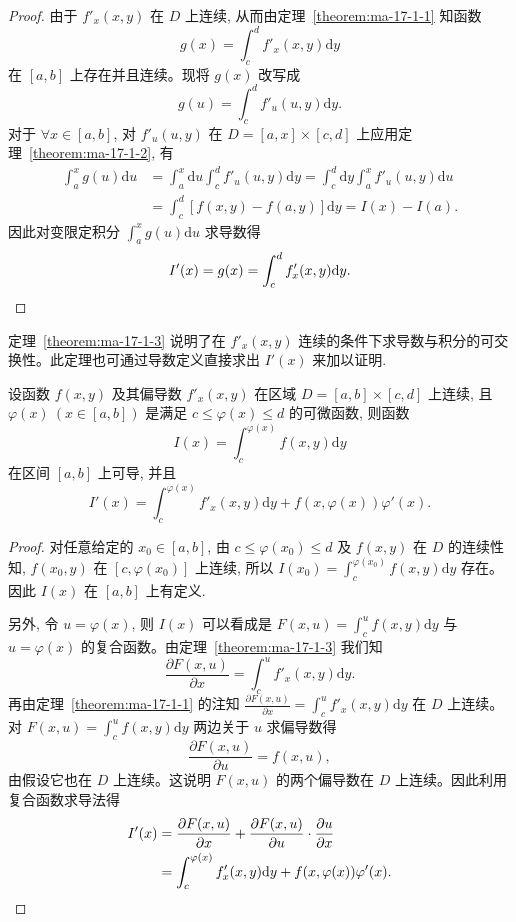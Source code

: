 \begin{proof}
由于 $f'_x(x,y)$ 在 $D$ 上连续, 从而由定理~\ref{theorem:ma-17-1-1} 知函数
\[
  g(x)=\int_c^d f'_x(x,y)\mathrm dy
\]
在 $[a,b]$ 上存在并且连续。现将 $g(x)$ 改写成
\[
  g(u)=\int_c^d f'_u(u,y)\mathrm dy.
\]
对于 $\forall x\in[a,b]$, 对 $f'_u(u,y)$ 在 $D=[a,x]\times[c,d]$ 上应用定理~\ref{theorem:ma-17-1-2}, 有
\[
\begin{aligned}
  \int_a^x g(u)\mathrm du
  &=\int_a^x \mathrm du\int_c^d f'_u(u,y)\mathrm dy
    =\int_c^d \mathrm dy\int_a^x f'_u(u,y)\mathrm du\\
  &=\int_c^d [f(x,y)-f(a,y)]\mathrm dy
    = I(x)-I(a).
\end{aligned}
\]
因此对变限定积分 $\int_a^x g(u)\mathrm du$ 求导数得
\[
  I'(x)=g(x)=\int_c^d f'_x(x,y)\mathrm dy.
\qedhere
\]
\end{proof}


定理~\ref{theorem:ma-17-1-3} 说明了在 $f'_x(x,y)$ 连续的条件下求导数与积分的可交换性。此定理也可通过导数定义直接求出 $I'(x)$ 来加以证明.

\begin{theorem}\label{theorem:ma-17-1-4}
设函数 $f(x,y)$ 及其偏导数 $f'_x(x,y)$ 在区域 $D=[a,b]\times[c,d]$ 上连续, 且 $\varphi(x)\ (x\in[a,b])$ 是满足 $c\leqslant \varphi(x)\leqslant d$ 的可微函数, 则函数
\[
  I(x)=\int_c^{\varphi(x)} f(x,y)\mathrm dy
\]
在区间 $[a,b]$ 上可导, 并且
\[
  I'(x)=\int_c^{\varphi(x)} f'_x(x,y)\mathrm dy
  + f(x,\varphi(x))\varphi'(x).
\]
\end{theorem}


\begin{proof}
对任意给定的 $x_0\in[a,b]$, 由 $c\leqslant\varphi(x_0)\leqslant d$ 及 $f(x,y)$ 在 $D$ 的连续性知, $f(x_0,y)$ 在 $[c,\varphi(x_0)]$ 上连续, 所以 $I(x_0)=\int_c^{\varphi(x_0)}f(x,y)\mathrm dy$ 存在。因此 $I(x)$ 在 $[a,b]$ 上有定义.

另外, 令 $u=\varphi(x)$, 则 $I(x)$ 可以看成是 $F(x,u)=\int_c^u f(x,y)\mathrm dy$ 与 $u=\varphi(x)$ 的复合函数。由定理~\ref{theorem:ma-17-1-3} 我们知
\[
  \frac{\partial F(x,u)}{\partial x}=\int_c^u f'_x(x,y)\mathrm dy.
\]
再由定理~\ref{theorem:ma-17-1-1} 的注知 $\frac{\partial F(x,u)}{\partial x}=\int_c^u f'_x(x,y)\mathrm dy$ 在 $D$ 上连续。对 $F(x,u)=\int_c^u f(x,y)\mathrm dy$ 两边关于 $u$ 求偏导数得
\[
  \frac{\partial F(x,u)}{\partial u}=f(x,u),
\]
由假设它也在 $D$ 上连续。这说明 $F(x,u)$ 的两个偏导数在 $D$ 上连续。因此利用复合函数求导法得
\[
\begin{aligned}
  I'(x)
  &=\frac{\partial F(x,u)}{\partial x}
    +\frac{\partial F(x,u)}{\partial u}\cdot\frac{\partial u}{\partial x}\\
  &=\int_c^{\varphi(x)} f'_x(x,y)\mathrm dy
    +f(x,\varphi(x))\varphi'(x).
\end{aligned}
\qedhere
\]
\end{proof}


